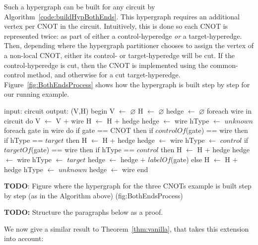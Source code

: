 

Such a hypergraph can be built for any circuit by Algorithm~\ref{code:buildHypBothEnds}. This hypergraph requires an additional vertex per CNOT in the circuit. Intuitively, this is done so each CNOT is represented twice: as part of either a control-hyperedge \textit{or} a target-hyperedge. Then, depending where the hypergraph partitioner chooses to assign the vertex of a non-local CNOT, either its control- or target-hyperedge will be cut. If the control-hyperedge is cut, then the CNOT is implemented using the common-control method, and otherwise for a cut target-hyperedge. Figure~\ref{fig:BothEndsProcess} shows how the hypergraph is built step by step for our running example. 

\begin{algorithm}[caption={Builds the hypergraph of a given circuit, without choosing whether CNOT gates are implemented through common control or common target. This algorithm runs in time \(O(g)\), where \(g\) is the number of gates in the input circuit.}, label={code:buildHypBothEnds}]
input: circuit
output: (V,H)
begin
  V $\gets$ $\varnothing$
  H $\gets$ $\varnothing$
  hedge $\gets$ $\varnothing$
  foreach wire in circuit do
    V $\gets$ V $+$ {wire}
    H $\gets$ H $+$ {hedge}
    hedge $\gets$ {wire}
    hType $\gets$ $unknown$
    foreach gate in wire do
      if gate == CNOT then
        if $controlOf$(gate) == wire then
          if hType == $target$ then
            H $\gets$ H $+$ {hedge}
            hedge $\gets$ {wire}
          hType $\gets$ $control$
        if $targetOf$(gate) == wire then
          if hType == $control$ then
            H $\gets$ H $+$ {hedge}
            hedge $\gets$ {wire}  
          hType $\gets$ $target$
        hedge $\gets$ hedge $+$ {$labelOf$(gate)}
      else
        H $\gets$ H $+$ {hedge}
        hType $\gets$ $unknown$
        hedge $\gets$ {wire}
end
\end{algorithm}

\textbf{TODO}: Figure where the hypergraph for the three CNOTs example is built step by step (as in the Algorithm above) (fig:BothEndsProcess)

\textbf{TODO:} Structure the paragraphs below as a proof.

We now give a similar result to Theorem~\ref{thm:vanilla}, that takes this extension into account:

